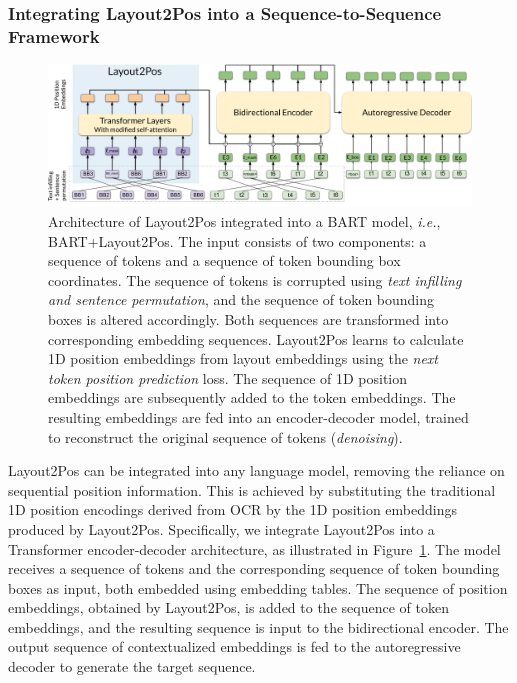 \subsubsection{Integrating Layout2Pos into a Sequence-to-Sequence Framework}

\begin{figure}
  \centering
  \includegraphics[width=\textwidth]{images/chapter4/Layout2Pos+BART.pdf}
  \caption{Architecture of Layout2Pos integrated into a BART model, \textit{i.e.}, BART+Layout2Pos. The input consists of two components: a sequence of tokens and a sequence of token bounding box coordinates. The sequence of tokens is corrupted using \textit{text infilling and sentence permutation}, and the sequence of token bounding boxes is altered accordingly. Both  sequences are transformed into corresponding embedding sequences. Layout2Pos learns to calculate 1D position embeddings from layout embeddings using the \textit{next token position prediction} loss. The sequence of 1D position embeddings are subsequently added to the token embeddings. The resulting embeddings are fed into an encoder-decoder model, trained to reconstruct the original sequence of tokens (\textit{denoising}).}
  \label{fig:layout2pos-ed}
\end{figure}

Layout2Pos can be integrated into any language model, removing the reliance on sequential position information. This is achieved by substituting the traditional 1D position encodings derived from \ac{OCR} by the 1D position embeddings produced by Layout2Pos. Specifically, we integrate Layout2Pos into a Transformer encoder-decoder architecture, as illustrated in Figure~\ref{fig:layout2pos-ed}. The model receives a sequence of tokens and the corresponding sequence of token bounding boxes as input, both embedded using embedding tables. The sequence of position embeddings, obtained by Layout2Pos, is added to the sequence of token embeddings, and the resulting sequence is input to the bidirectional encoder. The output sequence of contextualized embeddings is fed to the autoregressive decoder to generate the target sequence.

